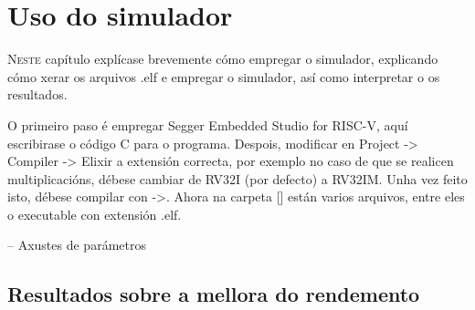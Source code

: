 \chapter{Uso do simulador}
\label{chap:uso_simulador}

\lettrine{N}{este} capítulo explícase brevemente cómo empregar o simulador, explicando cómo xerar os arquivos .elf e empregar o simulador, así como interpretar o os resultados. 

O primeiro paso é empregar Segger Embedded Studio for RISC-V, aquí escribirase o código C para o programa. Despois, modificar en Project -> Compiler -> Elixir a extensión correcta, por exemplo no caso de que se realicen multiplicacións, débese cambiar de RV32I (por defecto) a RV32IM. Unha vez feito isto, débese compilar con ->. Ahora na carpeta [] están varios arquivos, entre eles o executable con extensión .elf.

-- Axustes de parámetros

\section{Resultados sobre a mellora do rendemento}\label{sec:rendemento}


